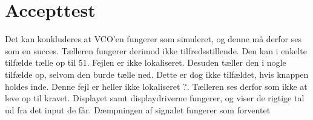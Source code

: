 \section{Accepttest}
\label{volumenkontrol-accepttest}
Det kan konkluderes at VCO'en fungerer som simuleret, og denne må derfor ses som en succes. Tælleren fungerer derimod ikke tilfredsstillende. Den kan i enkelte tilfælde tælle op til 51. Fejlen er ikke lokaliseret. Desuden tæller den i nogle tilfælde op, selvom den burde tælle ned. Dette er dog ikke tilfældet, hvis knappen holdes inde. Denne fejl er heller ikke lokaliseret ?. Tælleren ses derfor som ikke at leve op til kravet. Displayet samt displaydriverne fungerer, og viser de rigtige tal ud fra det input de får.
Dæmpningen af signalet fungerer som forventet